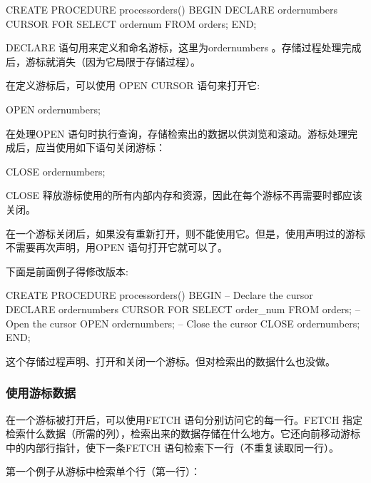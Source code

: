 \begin{sql}
CREATE PROCEDURE processorders()
BEGIN
   DECLARE ordernumbers CURSOR
   FOR
   SELECT ordernum FROM orders;
END;
\end{sql}

DECLARE 语句用来定义和命名游标，这里为ordernumbers 。存储过程处理完成后，游标就消失（因为它局限于存储过程）。

在定义游标后，可以使用 OPEN CURSOR 语句来打开它:

\begin{sql}
OPEN ordernumbers;
\end{sql}

在处理OPEN 语句时执行查询，存储检索出的数据以供浏览和滚动。游标处理完成后，应当使用如下语句关闭游标：

\begin{sql}
CLOSE ordernumbers;
\end{sql}

CLOSE 释放游标使用的所有内部内存和资源，因此在每个游标不再需要时都应该关闭。

在一个游标关闭后，如果没有重新打开，则不能使用它。但是，使用声明过的游标不需要再次声明，用OPEN 语句打开它就可以了。


下面是前面例子得修改版本:

\begin{sql}
CREATE PROCEDURE processorders()
BEGIN
   -- Declare the cursor
   DECLARE ordernumbers CURSOR
   FOR
   SELECT order_num FROM orders;
   -- Open the cursor
   OPEN ordernumbers;
   -- Close the cursor
   CLOSE ordernumbers;
END;
\end{sql}

这个存储过程声明、打开和关闭一个游标。但对检索出的数据什么也没做。

\subsubsection{使用游标数据}

在一个游标被打开后，可以使用FETCH 语句分别访问它的每一行。FETCH 指定检索什么数据（所需的列），检索出来的数据存储在什么地方。它还向前移动游标中的内部行指针，使下一条FETCH 语句检索下一行（不重复读取同一行）。

第一个例子从游标中检索单个行（第一行）：

